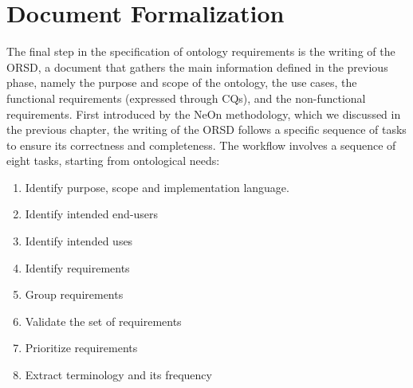 \section{Document Formalization}
The final step in the specification of ontology requirements is the writing of the ORSD, a document that gathers the main information defined in the previous phase, namely the purpose and scope of the ontology, the use cases, the functional requirements (expressed through CQs), and the non-functional requirements.
First introduced by the NeOn methodology, which we discussed in the previous chapter, the writing of the ORSD follows a specific sequence of tasks to ensure its correctness and completeness.
The workflow \cite{suarez2009write} involves a sequence of eight tasks, starting from ontological needs: 
\begin{enumerate}
    \item Identify purpose, scope and implementation language.
    \item Identify intended end-users
    \item Identify intended uses
    \item Identify requirements
    \item Group requirements
    \item Validate the set of requirements
    \item Prioritize requirements
    \item Extract terminology and its frequency
\end{enumerate}

